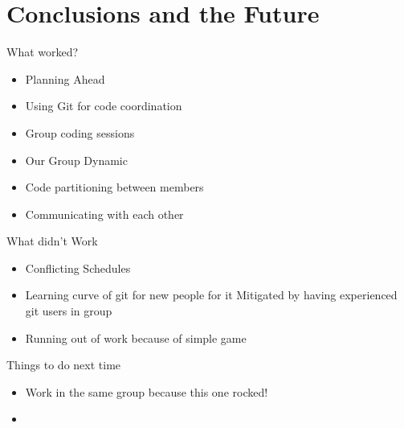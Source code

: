 \documentclass[compress, blue]{beamer}
\begin{document}
\section{Conclusions and the Future}

\begin{frame}{What worked?}

	\begin{itemize}
		\item Planning Ahead
		\item Using Git for code coordination
		\item Group coding sessions
		\item Our Group Dynamic
		\item Code partitioning between members
		\item Communicating with each other
	\end{itemize}

\end{frame}

\begin{frame}{What didn't Work}

	\begin{itemize}
		\item Conflicting Schedules
		\item Learning curve of git for new people for it
		\subitem Mitigated by having experienced git users in group
		\item Running out of work because of simple game 
	\end{itemize}

\end{frame}

\begin{frame}{Things to do next time}

	\begin{itemize}
		\item Work in the same group because this one rocked!
		\item 
	\end{itemize}
	
\end{frame}
\end{document}
